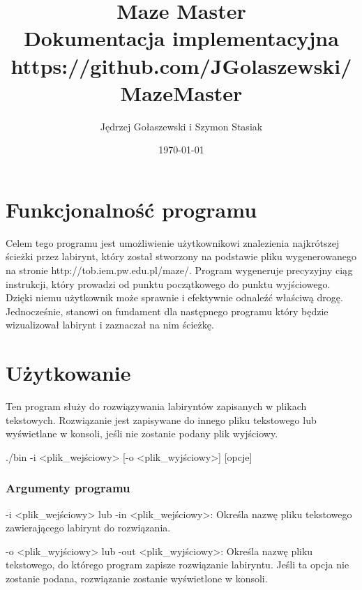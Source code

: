 \documentclass[
]{article}
\title {Maze Master \\[1ex] \large Dokumentacja implementacyjna \\[1ex] https://github.com/JGolaszewski/MazeMaster}
\date{\today}
\author{Jędrzej Gołaszewski i Szymon Stasiak}
\begin{document}
\maketitle
\newpage
{}

\hypertarget{funkcjonalnoux15bux107-programu}{%
\section{\texorpdfstring{Funkcjonalność programu
}{Funkcjonalność programu }}\label{funkcjonalnoux15bux107-programu}}

Celem tego programu jest umożliwienie użytkownikowi znalezienia
najkrótszej ścieżki przez labirynt, który został stworzony na podstawie
pliku wygenerowanego na stronie http://tob.iem.pw.edu.pl/maze/. Program
wygeneruje precyzyjny ciąg instrukcji, który prowadzi od punktu
początkowego do punktu wyjściowego. Dzięki niemu użytkownik może
sprawnie i efektywnie odnaleźć właściwą drogę. Jednocześnie, stanowi on
fundament dla następnego programu który będzie wizualizował labirynt i
zaznaczał na nim ścieżkę.

\hypertarget{uux17cytkowanie}{%
\section{Użytkowanie}\label{uux17cytkowanie}}

Ten program służy do rozwiązywania labiryntów zapisanych w plikach
tekstowych. Rozwiązanie jest zapisywane do innego pliku tekstowego lub
wyświetlane w konsoli, jeśli nie zostanie podany plik wyjściowy.

./bin -i \textless plik\_wejściowy\textgreater{} {[}-o
\textless plik\_wyjściowy\textgreater{]} {[}opcje{]}

\hypertarget{argumenty-programu}{%
\subsubsection{Argumenty programu}\label{argumenty-programu}}

-i \textless plik\_wejściowy\textgreater{} lub -in
\textless plik\_wejściowy\textgreater: Określa nazwę pliku tekstowego
zawierającego labirynt do rozwiązania.

-o \textless plik\_wyjściowy\textgreater{} lub -out
\textless plik\_wyjściowy\textgreater: Określa nazwę pliku tekstowego,
do którego program zapisze rozwiązanie labiryntu. Jeśli ta opcja nie
zostanie podana, rozwiązanie zostanie wyświetlone w konsoli.
\end{document}
